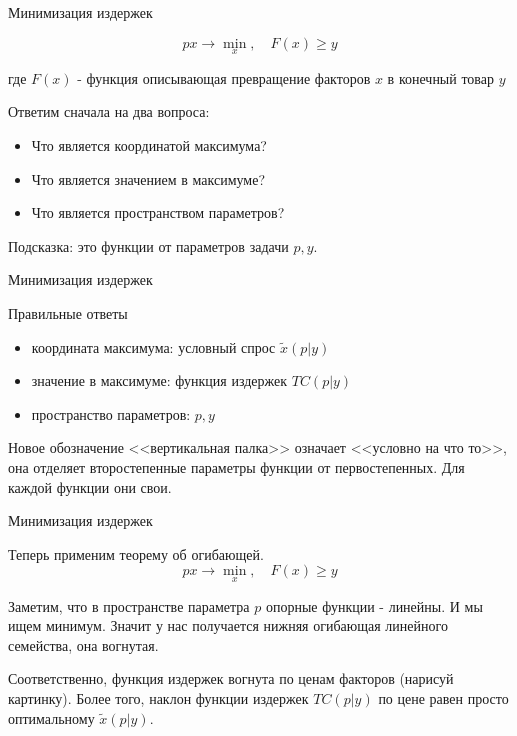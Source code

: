 \documentclass{beamer}
\begin{document}
\begin{frame}{Минимизация издержек}

$$ p x \to \min_x, \quad F(x) \geqslant y $$

где $F(x)$ - функция описывающая превращение факторов $x$ в конечный товар $y$

Ответим сначала на два вопроса:

\begin{itemize}
  \item Что является координатой максимума?
  \item Что является значением в максимуме?
  \item Что является пространством параметров?
\end{itemize}

Подсказка: это функции от параметров задачи $p, y$.

\end{frame}

\begin{frame}{Минимизация издержек}

Правильные ответы

\begin{itemize}
  \item координата максимума: условный спрос $\tilde x(p| y)$
  \item значение в максимуме: функция издержек $TC(p| y)$
  \item пространство параметров: $p, y$
\end{itemize}

Новое обозначение <<вертикальная палка>> означает <<условно на что то>>, она отделяет второстепенные параметры функции от первостепенных. Для каждой функции они свои.

\end{frame}

\begin{frame}{Минимизация издержек}

Теперь применим теорему об огибающей.
$$ p x \to \min_x, \quad F(x) \geqslant y $$

Заметим, что в пространстве параметра $p$ опорные функции - линейны. И мы ищем минимум. Значит у нас получается нижняя огибающая линейного семейства, она вогнутая. 

Соответственно, функция издержек вогнута по ценам факторов (нарисуй картинку). Более того, наклон функции издержек $TC(p|y)$ по цене равен просто оптимальному $\tilde x(p|y)$.

\end{frame}
\end{document}
